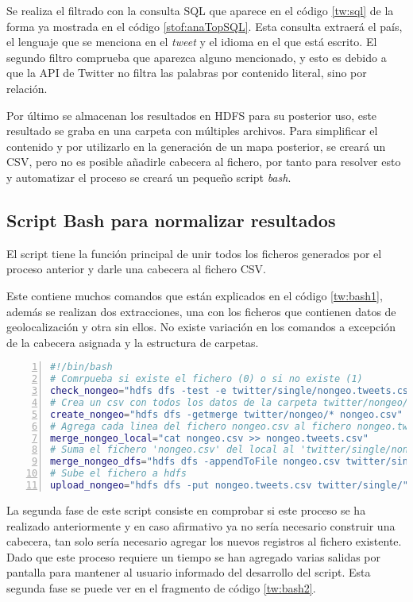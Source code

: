 Se realiza el filtrado con la consulta \gls{SQL} que aparece en el código \ref{tw:sql} de la forma ya mostrada en el código \ref{stof:anaTopSQL}. Esta consulta extraerá el país, el lenguaje que se menciona en el \textit{tweet} y el idioma en el que está escrito. El segundo filtro comprueba que aparezca alguno mencionado, y esto es debido a que la \gls{API} de Twitter no filtra las palabras por contenido literal, sino por relación.

Por último se almacenan los resultados en HDFS para su posterior uso, este resultado se graba en una carpeta con múltiples archivos. Para simplificar el contenido y por utilizarlo en la generación de un mapa posterior, se creará un \gls{CSV}, pero no es posible añadirle cabecera al fichero, por tanto para resolver esto y automatizar el proceso se creará un pequeño script \textit{bash}.

\subsection{Script Bash para normalizar resultados}
El script tiene la función principal de unir todos los ficheros generados por el proceso anterior y darle una cabecera al fichero \gls{CSV}.

Este contiene muchos comandos que están explicados en el código \ref{tw:bash1}, además se realizan dos extracciones, una con los ficheros que contienen datos de geolocalización y otra sin ellos. No existe variación en los comandos a excepción de la cabecera asignada y la estructura de carpetas.

\begin{lstlisting}[label=tw:bash1,language=sh,frame=single,caption=Comandos utilizados durante el proceso de unificación de datos., firstnumber=1,numbers=left]
#!/bin/bash
# Comrpueba si existe el fichero (0) o si no existe (1)
check_nongeo="hdfs dfs -test -e twitter/single/nongeo.tweets.csv"
# Crea un csv con todos los datos de la carpeta twitter/nongeo/*
create_nongeo="hdfs dfs -getmerge twitter/nongeo/* nongeo.csv"
# Agrega cada linea del fichero nongeo.csv al fichero nongeo.tweets.csv
merge_nongeo_local="cat nongeo.csv >> nongeo.tweets.csv"
# Suma el fichero 'nongeo.csv' del local al 'twitter/single/nongeo.tweets.csv' del hdfs
merge_nongeo_dfs="hdfs dfs -appendToFile nongeo.csv twitter/single/nongeo.tweets.csv"
# Sube el fichero a hdfs
upload_nongeo="hdfs dfs -put nongeo.tweets.csv twitter/single/"
\end{lstlisting}

La segunda fase de este script consiste en comprobar si este proceso se ha realizado anteriormente y en caso afirmativo ya no sería necesario construir una cabecera, tan solo sería necesario agregar los nuevos registros al fichero existente. Dado que este proceso requiere un tiempo se han agregado varias salidas por pantalla para mantener al usuario informado del desarrollo del script. Esta segunda fase se puede ver en el fragmento de código \ref{tw:bash2}.

